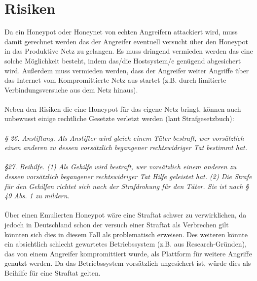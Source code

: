 \section{Risiken}
Da ein Honeypot oder Honeynet von echten Angreifern attackiert wird, muss damit gerechnet werden das der Angreifer eventuell versucht über den Honeypot in das Produktive Netz zu gelangen. Es muss dringend vermieden werden das eine solche Möglichkeit besteht, indem das/die Hostsystem/e genügend abgesichert wird. Außerdem muss vermieden werden, dass der Angreifer weiter Angriffe über das Internet vom Kompromittierte Netz aus startet (z.B. durch limitierte Verbindungsversuche aus dem Netz hinaus). \\
\\
Neben den Risiken die eine Honeypot für das eigene Netz bringt, können auch unbewusst einige rechtliche Gesetzte verletzt werden (laut Strafgesetzbuch):\\
\\
\emph{§ 26. Anstiftung. Als Anstifter wird gleich einem Täter bestraft, wer vorsätzlich einen anderen zu dessen vorsätzlich begangener rechtswidriger Tat bestimmt hat.}\\
\\
\emph{§27. Beihilfe. (1) Als Gehilfe wird bestraft, wer vorsätzlich einem anderen zu dessen vorsätzlich begangener rechtswidriger Tat Hilfe geleistet hat. (2) Die Strafe für den Gehilfen richtet sich nach der Strafdrohung für den Täter. Sie ist nach § 49 Abs. 1 zu mildern.}\\
\\
Über einen Emulierten Honeypot wäre eine Straftat schwer zu verwirklichen, da jedoch in Deutschland schon der versuch einer Straftat als Verbrechen gilt könnten sich dies in diesem Fall als problematisch erweisen.
Des weiteren könnte ein absichtlich schlecht gewartetes Betriebssystem (z.B. aus Research-Gründen), das von einem Angreifer kompromittiert wurde, als Plattform für weitere Angriffe genutzt werden. Da das Betriebssystem vorsätzlich ungesichert ist, würde dies als Beihilfe für eine Straftat gelten.  

 